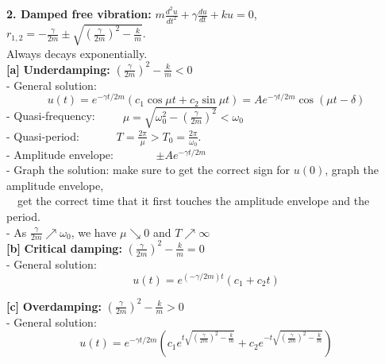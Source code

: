 \documentclass[11pt]{article}
\numberwithin{equation}{section}
\begin{document}
\noindent \textbf{2. Damped free vibration: } $m\frac{d^2u}{dt^2}+\gamma\frac{du}{dt}+ku=0$, \ \ \ \ \ \ \ 
$r_{1,2}=-\frac{\gamma}{2m}\pm \sqrt{\left(\frac{\gamma}{2m}\right)^2-\frac{k}{m}}$.\\
\indent \hspace{2in} Always decays exponentially.  \\

\noindent \textbf{[a]} \textbf{Underdamping: } $\left(\frac{\gamma}{2m}\right)^2-\frac{k}{m}<0$\\
\indent - General solution:
\[u(t)=e^{-\gamma t/2m}(c_1\cos\mu t+c_2\sin\mu t)=Ae^{-\gamma t/2m}\cos(\mu t-\delta)\]
\indent - Quasi-frequency:\ \ \ \ \ $\mu=\sqrt{\omega_0^2-\left(\frac{\gamma}{2m}\right)^2}<\omega_0$\\
\indent - Quasi-period: \ \ \ \ \ \ $T=\frac{2\pi}{\mu}>T_0=\frac{2\pi}{\omega_0}$.\\
\indent - Amplitude envelope: \ \ \ \ \ \ \ $\pm Ae^{-\gamma t/2m}$\\
\indent - Graph the solution: make sure to get the correct sign for $u(0)$, graph the amplitude envelope,\\
\indent \ \  get the correct time that it first touches the amplitude envelope and the period. \\
\indent - As $\frac{\gamma}{2m} \nearrow \omega_0$, we have $\mu\searrow 0$ and $T\nearrow\infty$ \\


\noindent \textbf{[b]} \textbf{Critical damping: } $\left(\frac{\gamma}{2m}\right)^2-\frac{k}{m}=0$ \\
\indent - General solution: \[u(t)=e^{(-\gamma/2m)t}(c_1+c_2t)\]

\noindent \textbf{[c]} \textbf{Overdamping: } $\left(\frac{\gamma}{2m}\right)^2-\frac{k}{m}>0$ \\
\indent - General solution: \[u(t)=e^{-\gamma t/2m}\left(c_1e^{t\sqrt{\left(\frac{\gamma}{2m}\right)^2-\frac{k}{m}}}+c_2e^{-t\sqrt{\left(\frac{\gamma}{2m}\right)^2-\frac{k}{m}}}\right)\]\\
\end{document}
